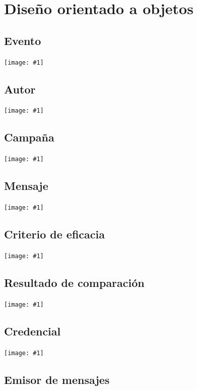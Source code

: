 \documentclass[a4paper, 10pt, twoside]{article}
\newcommand{\grafico}[1]{
  \begin{center}
    \texttt{[image: \#1]}
  \end{center}
}
\begin{document}
\newpage
\section{Diseño orientado a objetos}


\subsection{Evento}

\grafico{diagramas/evento.pdf}


\subsection{Autor}

\grafico{diagramas/autor.pdf}


\subsection{Campaña}

\grafico{diagramas/campania.pdf}


\subsection{Mensaje}

\grafico{diagramas/mensaje.pdf}


\subsection{Criterio de eficacia}

\grafico{diagramas/criterioDeEficacia.pdf}


\subsection{Resultado de comparación}

\grafico{diagramas/resultadoDeComparacion.pdf}


\subsection{Credencial}

\grafico{diagramas/credencial.pdf}


\subsection{Emisor de mensajes}
\end{document}
